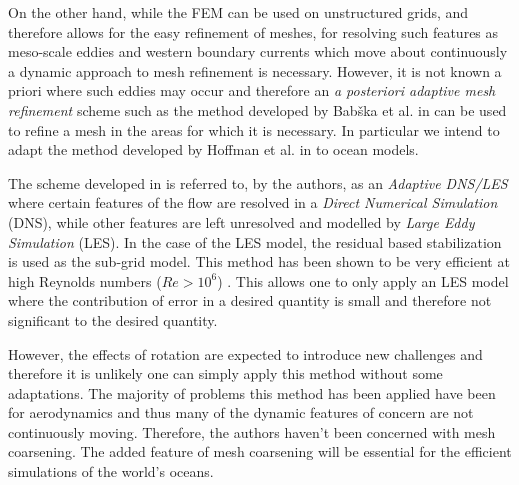 On the other hand, while the FEM can be used on unstructured grids, and
therefore allows for the easy refinement of meshes, for resolving such
features as meso-scale eddies and western boundary currents which move about
continuously a dynamic approach to mesh refinement is necessary.  However, it
is not known a priori where such eddies may occur and therefore an \emph{a
posteriori adaptive mesh refinement} scheme such as the method developed by
Bab{\v{s}}ka et al. in \cite{Babuska1978} can be used to refine a mesh in the
areas for which it is necessary. In particular we intend to adapt the method
developed by Hoffman et al. in \cite{Hoffman2004} to ocean models. 

The scheme developed in \cite{Hoffman2004} is referred to, by the authors, as
an \emph{Adaptive DNS/LES} where certain features of the flow are resolved in a
\emph{Direct Numerical Simulation} (DNS), while other features are left
unresolved and modelled by \emph{Large Eddy Simulation} (LES). In the case of
the LES model, the residual based stabilization is used as the sub-grid model.
This method has been shown to be very efficient at high Reynolds numbers
($Re>10^6$) \cite{Jansson2011}. This allows one to only apply an LES model
where the contribution of error in a desired quantity is small and therefore
not significant to the desired quantity.

However, the effects of rotation are expected to introduce new challenges and
therefore it is unlikely one can simply apply this method without some
adaptations. The majority of problems this method has been applied have been
for aerodynamics and thus many of the dynamic features of concern are not
continuously moving. Therefore, the authors haven't been concerned with mesh
coarsening. The added feature of mesh coarsening will be essential for the
efficient simulations of the world's oceans.
